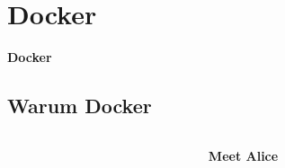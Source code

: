 \section{Docker}\label{sec:docker}



\begin{frame}[b]
    \begin{center}
        \fontsize{48pt}{48pt}
        \faCodeBranch
    \end{center}
    \vfill
    \begin{flushleft}
        \Huge
        \textbf{Docker}
    \end{flushleft}
\end{frame}

\subsection{Warum Docker}\label{subsec:warumdocker}

\begin{frame}[c]
    \begin{columns}[c]
        \begin{column}{.5\textwidth}
            \centering
            
        \end{column}
        \begin{column}{.5\textwidth}
            \Large
            \textcolor{TUDa-10a}{\textbf{Meet Alice}}
        \end{column}
    \end{columns}
\end{frame}

